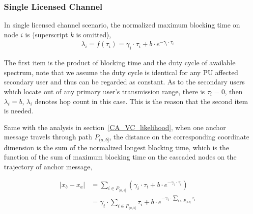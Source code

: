 \subsubsection{Single Licensed Channel}
In single licensed channel scenario, the normalized maximum blocking time on node $i$ is (superscript $k$ is omitted), 
\begin{equation}
\label{eq:SingleChannel_blockingtime}
\begin{aligned}
\lambda_i = f(\tau_i) = \gamma_i\cdot \tau_i + b\cdot e^{-\gamma_i\cdot \tau_i}
\end{aligned}
\end{equation}


The first item is the product of blocking time and the duty cycle of available spectrum, note that we assume the duty cycle is identical for any PU affected secondary user and thus can be regarded as constant.
As to the secondary users which locate out of any primary user's transmission range, there is $\tau_i=0$, then $\lambda_i=b$, $\lambda_i$ denotes hop count in this case.
This is the reason that the second item is needed.

Same with the analysis in section~\ref{CA_VC_likelihood}, when one anchor message travels through path $P_{(a,b]}$, the distance on the corresponding coordinate dimension is the sum of the normalized longest blocking time, which is the function of the sum of maximum blocking time on the cascaded nodes on the trajectory of anchor message,

\begin{equation}
\label{distance2}
\begin{split}
|x_b-x_a| & =  \sum_{i\in P_{(a,b]}} (\gamma_i\cdot \tau_i + b\cdot e^{-\gamma_i\cdot \tau_i}) \\
		  & = \gamma_i\cdot \sum_{i\in P_{(a,b]}}\tau_i + b\cdot e^{-\gamma_i\cdot \sum_{i\in P_{(a,b]}}\tau_i}
\end{split}
\end{equation}

